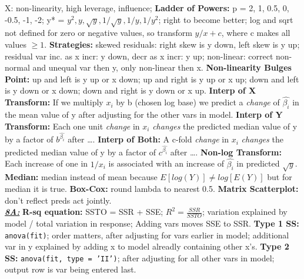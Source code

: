 \documentclass[8pt]{extarticle}
\begin{document}
X: non-linearity, high leverage, influence;
\textbf{Ladder of Powers:} p = 2, 1, 0.5, 0, -0.5, -1, -2; y* = $y^2, y,
\sqrt{y}, 1/\sqrt{y}, 1/y, 1/y^2$; right to become better; log and sqrt not
defined for zero or negative values, so transform $y/x + c$, where c makes all 
values $\geq 1$.
\textbf{Strategies:} skewed residuals: right skew is y down, left skew is y up;
residual var inc. as x incr: y down, decr as x incr: y up; non-linear: correct 
non-normal and unequal var then y, only non-linear then x.
\textbf{Non-linearity Bulges Point:} up and left is y up or x down; up and 
right is y up or x up; down and left is y down or x down; down and right is y 
down or x up.
\textbf{Interp of X Transform:} If we multiply $x_i$ by b (chosen log base) we 
predict a \textit{change} of $\hat{\beta_i}$ in the mean value of y after adjusting 
for the other vars in model.
\textbf{Interp of Y Transform:} Each one unit \textit{change} in $x_i$ \textit{changes} 
the 
predicted median value of y by a factor of $b^{\hat{\beta_i}}$ after \dots.
\textbf{Interp of Both:} A c-fold \textit{change} in $x_i$ \textit{changes} the 
predicted median 
value of y by a factor of $c^{\hat{\beta_i}}$ after \dots.
\textbf{Non-log Transform:} Each increase of one in $1/x_i$ is associated with 
an increase of $\hat{\beta_i}$ in predicted $\sqrt{y}$.
\textbf{Median:} median instead of mean because $E[log(Y)] \neq log[E(Y)]$ but 
for median it is true.
\textbf{Box-Cox:} round lambda to nearest 0.5.
\textbf{Matrix Scatterplot:} don't reflect preds act jointly.\\

\textit{\textbf{\underline{8A:}}}
\textbf{R-sq equation:} SSTO = SSR + SSE; $R^2 = \frac{SSR}{SSTO}$; variation 
explained by model / total variation in response; Adding vars moves SSE to SSR.
\textbf{Type 1 SS:} \texttt{anova(fit)}; order matters, after adjusting for vars 
earlier in model; additional var in y explained by adding x to model alreadly 
containing other x's.
\textbf{Type 2 SS:} \texttt{anova(fit, type = 'II')}; after adjusting for all 
other vars in model; output row is var being entered last.\\
\end{document}
